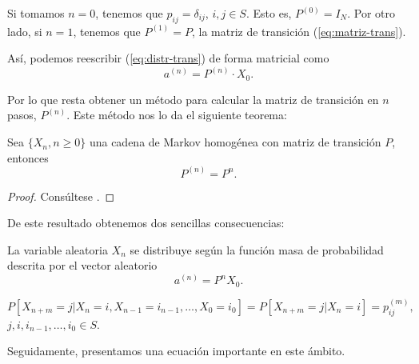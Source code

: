 \begin{observacion}
    Si tomamos $n=0$, tenemos que $p_{ij}=\delta_{ij}$, $i,j\in S$. Esto es, $P^{(0)}=I_N$. Por otro lado, si $n=1$, tenemos que $P^{(1)}=P$, la matriz de transición (\ref{eq:matriz-trans}).
\end{observacion}

Así, podemos reescribir (\ref{eq:distr-trans}) de forma matricial como
$$
a^{(n)}= P^{(n)} \cdot X_0.
$$

Por lo que resta obtener un método para calcular la matriz de transición en $n$ pasos, $P^{(n)}$. Este método nos lo da el siguiente teorema:

\begin{teorema}
    \label{th:matriz-trans-n}
    Sea $\{X_n,n\geq 0\}$ una cadena de Markov homogénea con matriz de transición $P$, entonces
    \begin{equation}
        \label{eq:matriz-trans-n-teorema}
        P^{(n)} = P^n.
    \end{equation}    
\end{teorema}
\begin{proof}
    Consúltese \cite[Ch. II, theorem 2.2]{kulkarni-2012}.
\end{proof}

De este resultado obtenemos dos sencillas consecuencias:

\begin{corolario}
    \label{cor:fmp}
    La variable aleatoria $X_n$ se distribuye según la función masa de probabilidad descrita por el vector aleatorio 
    $$
    a^{(n)} = P^n X_0.
    $$
\end{corolario}

\begin{corolario}
    \label{cor:Pnm}
    $$
    P[X_{n+m}=j|X_n=i,X_{n-1}=i_{n-1},\dots,X_0=i_0] = P[X_{n+m}=j|X_n=i]=p_{ij}^{(m)},
    $$
$j,i,i_{n-1},\dots,i_0\in S$.
\end{corolario}

Seguidamente, presentamos una ecuación importante en este ámbito.

